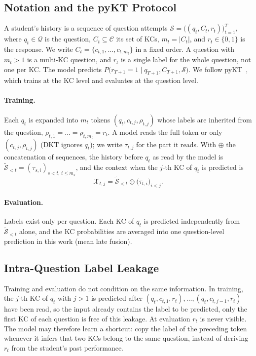 \subsection{Notation and the pyKT Protocol}
\label{subsec:pyKT-protocol}
A student's history is a sequence of question attempts $\mathcal{S}=\big((q_t,C_t,r_t)\big)_{t=1}^{T}$, where $q_t\in\mathcal{Q}$ is the question, $C_t\subseteq\mathcal{C}$ its set of KCs, $m_t=|C_t|$, and $r_t\in\{0,1\}$ is the response. 
We write $C_t=\{c_{t,1},\dots,c_{t,m_t}\}$ in a fixed order. A question with $m_t>1$ is a multi-KC question, and $r_t$ is a single label for the whole question, not one per KC. 
The model predicts $P\big(r_{T+1}=1\mid q_{T+1},C_{T+1},\mathcal{S}\big)$. 
We follow pyKT~\cite{liu2022pykt}, which trains at the KC level and evaluates at the question level.
 
\paragraph{Training.} Each $q_t$ is expanded into $m_t$ tokens $(q_t,c_{t,j},\rho_{t,j})$ whose labels are inherited from the question, $\rho_{t,1}=\dots=\rho_{t,m_t}=r_t$. 
A model reads the full token or only $(c_{t,j},\rho_{t,j})$ (DKT ignores $q_t$); we write $\tau_{t,j}$ for the part it reads. 
With $\oplus$ the concatenation of sequences, the history before $q_t$ as read by the model is $\tilde{\mathcal{S}}_{<t}=(\tau_{s,i})_{s<t,\,i\le m_s}$, and the context when the $j$-th KC of $q_t$ is predicted is
\begin{equation}
  \mathcal{X}_{t,j}=\tilde{\mathcal{S}}_{<t}\oplus\big(\tau_{t,i}\big)_{i<j}.
  \label{eq:context}
\end{equation}
 
\paragraph{Evaluation.} Labels exist only per question. Each KC of $q_t$ is predicted independently from $\tilde{\mathcal{S}}_{<t}$ alone, and the KC probabilities are averaged into one question-level prediction in this work (mean late fusion).
 
\subsection{Intra-Question Label Leakage}
\label{subsec:label-leakage}
Training and evaluation do not condition on the same information. 
In training, the $j$-th KC of $q_t$ with $j>1$ is predicted after $(q_t,c_{t,1},r_t),\dots,(q_t,c_{t,j-1},r_t)$ have been read, so the input already contains the label to be predicted, only the first KC of each question is free of this leakage. 
At evaluation $r_t$ is never visible. 
The model may therefore learn a shortcut: copy the label of the preceding token whenever it infers that two KCs belong to the same question, instead of deriving $r_t$ from the student's past performance.
